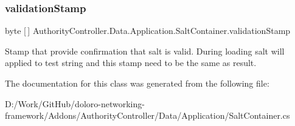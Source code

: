 \subsubsection{\texorpdfstring{validation\+Stamp}{validationStamp}}
{\footnotesize\ttfamily byte \mbox{[}$\,$\mbox{]} Authority\+Controller.\+Data.\+Application.\+Salt\+Container.\+validation\+Stamp}



Stamp that provide confirmation that salt is valid. During loading salt will applied to test string and this stamp need to be the same as result. 



The documentation for this class was generated from the following file\+:\begin{DoxyCompactItemize}
\item 
D\+:/\+Work/\+Git\+Hub/doloro-\/networking-\/framework/\+Addons/\+Authority\+Controller/\+Data/\+Application/Salt\+Container.\+cs\end{DoxyCompactItemize}
